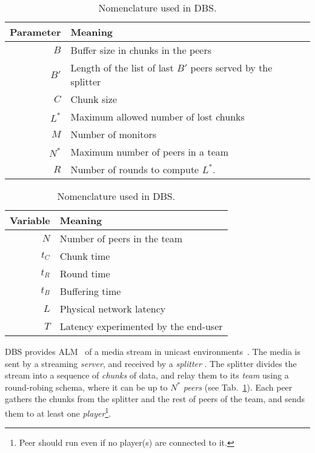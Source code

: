 
\label{sec:DBS}

\begin{table}
  \centering
  \begin{tabular}{rl}
    Parameter & Meaning \\
    \hline
    $B$    & Buffer size in chunks in the peers \\
    $B'$   & Length of the list of last $B'$ peers served by the splitter \\ 
    $C$    & Chunk size \\
    $L^*$  & Maximum allowed number of lost chunks \\
    $M$    & Number of monitors \\
    $N^*$  & Maximum number of peers in a team \\
    $R$    & Number of rounds to compute $L^*$.
  \end{tabular}
  \caption{Nomenclature used in DBS.\label{tab:DBS_parameters}}
\end{table}

\begin{table}
  \centering
  \begin{tabular}{rl}
    Variable & Meaning \\
    \hline
    $N$    & Number of peers in the team \\
    $t_C$  & Chunk time \\
    $t_R$  & Round time \\
    $t_B$  & Buffering time \\
    $L$    & Physical network latency \\
    $T$    & Latency experimented by the end-user
  \end{tabular}
  \caption{Nomenclature used in DBS.\label{tab:DBS_nomenclature}}
\end{table}

DBS provides ALM~\cite{banerjee2002scalable} of a media stream in
unicast environments~\cite{comer2003computer}. The media is sent by a
streaming \emph{server}, and received by a \emph{splitter} . The splitter divides the stream into a
sequence of \emph{chunks} of data, and relay them to its \emph{team}
using a round-robing schema, where it can be up to $N^*$ \emph{peers}
(see Tab.~\ref{tab:DBS_parameters}). Each peer gathers the chunks
from the splitter and the rest of peers of the team, and sends them to
at least one \emph{player}\footnote{Peer should run even if no
  player(s) are connected to it.}.

